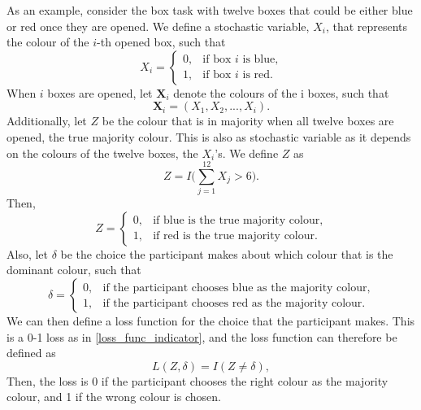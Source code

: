 As an example, consider the box task with twelve boxes that could be either blue or red once they are opened. We define a stochastic variable, $X_i$, that represents the colour of the $i$-th opened box, such that 
\begin{equation*}
    X_i =
    \begin{cases}
        0,& \text{if box }i \text{ is blue,}\\
        1,& \text{if box }i \text{ is red.}
    \end{cases}
\end{equation*}
When $i$ boxes are opened, let $\textbf{X}_i$ denote the colours of the i boxes, such that
\begin{equation*}
    \textbf{X}_i = (X_1,X_2,...,X_{i}).
\end{equation*}
Additionally, let $Z$ be the colour that is in majority when all twelve boxes are opened, the true majority colour. This is also as stochastic variable as it depends on the colours of the twelve boxes, the $X_i$'s. We define $Z$ as
\begin{equation}
\label{def_of_Z}
    Z = I\Big(\sum_{j=1}^{12}X_j > 6\Big).
\end{equation}
Then,
\begin{equation}
\label{Z_true_majority}
    Z = 
    \begin{cases}
        0,& \text{if blue is the true majority colour,} \\
        1,& \text{if red is the true majority colour.}
    \end{cases}
\end{equation}
Also, let $\delta$ be the choice the participant makes about which colour that is the dominant colour, such that
\begin{equation*}
    \delta = 
    \begin{cases}
        0,& \text{if the participant chooses blue as the majority colour,}\\
        1,& \text{if the participant chooses red as the majority colour}.
    \end{cases}
\end{equation*}
We can then define a loss function for the choice that the participant makes. This is a 0-1 loss as in \eqref{loss_func_indicator}, and the loss function can therefore be defined as 
\begin{equation}
\label{loss_func_example}
    L(Z,\delta) = I(Z \neq \delta),
\end{equation}
Then, the loss is 0 if the participant chooses the right colour as the majority colour, and 1 if the wrong colour is chosen. 


